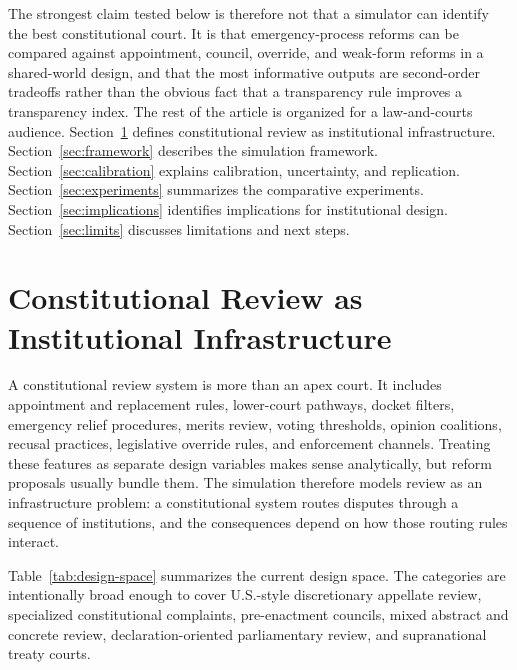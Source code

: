 \documentclass[
  journal=small,
  manuscript=research-article,
  year=2026
]{cup-journal}
\begin{document}
The strongest claim tested below is therefore not that a simulator can identify the best constitutional court. It is that emergency-process reforms can be compared against appointment, council, override, and weak-form reforms in a shared-world design, and that the most informative outputs are second-order tradeoffs rather than the obvious fact that a transparency rule improves a transparency index. The rest of the article is organized for a law-and-courts audience. Section~\ref{sec:infrastructure} defines constitutional review as institutional infrastructure. Section~\ref{sec:framework} describes the simulation framework. Section~\ref{sec:calibration} explains calibration, uncertainty, and replication. Section~\ref{sec:experiments} summarizes the comparative experiments. Section~\ref{sec:implications} identifies implications for institutional design. Section~\ref{sec:limits} discusses limitations and next steps.

\section{Constitutional Review as Institutional Infrastructure}
\label{sec:infrastructure}

A constitutional review system is more than an apex court. It includes appointment and replacement rules, lower-court pathways, docket filters, emergency relief procedures, merits review, voting thresholds, opinion coalitions, recusal practices, legislative override rules, and enforcement channels. Treating these features as separate design variables makes sense analytically, but reform proposals usually bundle them. The simulation therefore models review as an infrastructure problem: a constitutional system routes disputes through a sequence of institutions, and the consequences depend on how those routing rules interact.

Table~\ref{tab:design-space} summarizes the current design space. The categories are intentionally broad enough to cover U.S.-style discretionary appellate review, specialized constitutional complaints, pre-enactment councils, mixed abstract and concrete review, declaration-oriented parliamentary review, and supranational treaty courts.
\end{document}

